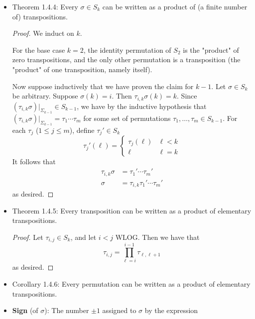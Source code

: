 \documentclass[../notes.tex]{subfiles}
\begin{document}
\begin{itemize}
    \item Theorem 1.4.4: Every $\sigma\in S_k$ can be written as a product of (a finite number of) transpositions.
    \begin{proof}
        We induct on $k$.\par
        For the base case $k=2$, the identity permutation of $S_2$ is the "product" of zero transpositions, and the only other permutation is a transposition (the "product" of one transposition, namely itself).\par
        Now suppose inductively that we have proven the claim for $k-1$. Let $\sigma\in S_k$ be arbitrary. Suppose $\sigma(k)=i$. Then $\tau_{i,k}\sigma(k)=k$. Since $(\tau_{i,k}\sigma)|_{\Sigma_{k-1}}\in S_{k-1}$, we have by the inductive hypothesis that $(\tau_{i,k}\sigma)|_{\Sigma_{k-1}}=\tau_1\cdots\tau_m$ for some set of permutations $\tau_1,\dots,\tau_m\in S_{k-1}$. For each $\tau_j$ ($1\leq j\leq m$), define $\tau_j'\in S_k$
        \begin{equation*}
            \tau_j'(\ell) =
            \begin{cases}
                \tau_j(\ell) & \ell<k\\
                \ell & \ell=k
            \end{cases}
        \end{equation*}
        It follows that
        \begin{align*}
            \tau_{i,k}\sigma &= \tau_1'\cdots\tau_m'\\
            \sigma &= \tau_{i,k}\tau_1'\cdots\tau_m'
        \end{align*}
        as desired.
    \end{proof}
    \item Theorem 1.4.5: Every transposition can be written as a product of elementary transpositions.
    \begin{proof}
        Let $\tau_{i,j}\in S_k$, and let $i<j$ WLOG. Then we have that
        \begin{equation*}
            \tau_{i,j} = \prod_{\ell=i}^{i-1}\tau_{\ell,\ell+1}
        \end{equation*}
        as desired.
    \end{proof}
    \item Corollary 1.4.6: Every permutation can be written as a product of elementary transpositions.
    \item \textbf{Sign} (of $\sigma$): The number $\pm 1$ assigned to $\sigma$ by the expression
    \begin{equation*}

\end{equation*}
\end{itemize}
\end{document}

